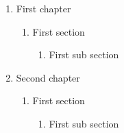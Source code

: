 \documentclass[10pt , a4paper]{article}
\begin{document}
  \begin{enumerate}[label=\arabic*,leftmargin=*,labelsep=2ex,ref=\arabic*]
    \item First chapter 
      \begin{enumerate}[label*=.\arabic*,leftmargin=*,labelsep=2ex]
        \item First section 
        \begin{enumerate}[label*=.\arabic*,leftmargin=*,labelsep=2ex]
        \item First sub section 
      \end{enumerate}
      \end{enumerate}
    \item Second chapter 
      \begin{enumerate}[label*=.\arabic*,leftmargin=*,labelsep=2ex]
        \item First section 
        \begin{enumerate}[label*=.\arabic*,leftmargin=*,labelsep=2ex]
        \item First sub section 
      \end{enumerate}
      \end{enumerate}
  \end{enumerate}
\end{document}
